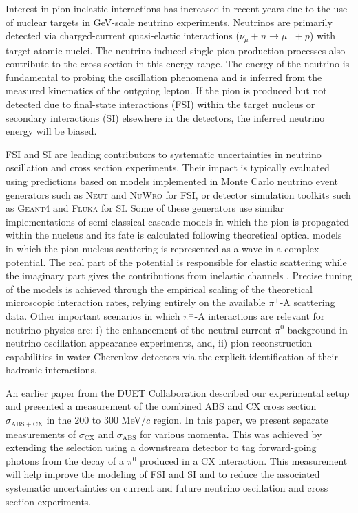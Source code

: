 Interest in pion inelastic interactions has increased in recent years due to the use of nuclear targets in GeV-scale neutrino experiments. Neutrinos are primarily detected via charged-current quasi-elastic interactions ($\nu_{\mu}+n\rightarrow \mu^{-} + p$) with target atomic nuclei. The neutrino-induced single pion production processes also contribute to the cross section in this energy range. The energy of the neutrino is fundamental to probing the oscillation phenomena and is inferred from the measured kinematics of the outgoing lepton.  If the pion is produced but not detected due to final-state interactions (FSI) within the target nucleus or secondary interactions (SI) elsewhere in the detectors, the inferred neutrino energy will be biased. 

FSI and SI are leading contributors to systematic uncertainties in neutrino oscillation and cross section experiments. Their impact is typically evaluated using predictions based on models implemented in Monte Carlo neutrino event generators such as \textsc{Neut} \cite{NEUT} and \textsc{NuWro} \cite{NuWro} for FSI, or detector simulation toolkits such as \textsc{Geant4} \cite{bertini} and \textsc{Fluka} \cite{fluka1,fluka2} for SI. Some of these generators use similar implementations of semi-classical cascade models in which the pion is propagated within the nucleus and its fate is calculated following theoretical optical models in which the pion-nucleus scattering is represented as a wave in a complex potential. The real part of the potential is responsible for elastic scattering while the imaginary part gives the contributions from inelastic channels \cite{Oset,Salcedo}. Precise tuning of the models is achieved through the empirical scaling of the theoretical microscopic interaction rates, relying entirely on the available $\pi^{\pm}$-A scattering data. Other important scenarios in which $\pi^{\pm}$-A interactions are relevant for neutrino physics are: i) the enhancement of the neutral-current $\pi^{0}$ background in neutrino oscillation appearance experiments, and, ii) pion reconstruction capabilities in water Cherenkov detectors via the explicit identification of their hadronic interactions.

An earlier paper from the DUET Collaboration \cite{duet} described our experimental setup and presented a measurement of the combined ABS and CX cross section $\sigma_{\mathrm{ABS}+\mathrm{CX}}$ in the 200 to 300 MeV$/c$ region. In this paper, we present separate measurements of $\sigma_{\mathrm{CX}}$ and $\sigma_{\mathrm{ABS}}$ for various momenta. This was achieved by extending the selection using a downstream detector to tag forward-going photons from the decay of a $\pi^0$ produced in a CX interaction. This measurement will help improve the modeling of FSI and SI and to reduce the associated systematic uncertainties on current and future neutrino oscillation and cross section experiments.